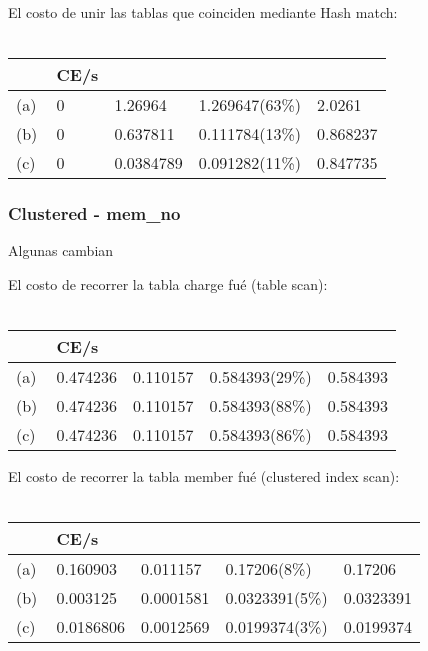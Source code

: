 El costo de unir las tablas que coinciden mediante Hash match: \\ \\

\begin{tabular}{| L | L | L | L | L |}
    \hline
     & CE/s &  &  &  \\ \hline
    (a) & 0 & 1.26964 & 1.269647(63\%) & 2.0261 \\ \hline
    (b) & 0 & 0.637811 & 0.111784(13\%) & 0.868237 \\ \hline
    (c) & 0 & 0.0384789 & 0.091282(11\%) & 0.847735 \\ \hline
\end{tabular}




\subsubsection{Clustered - mem\_no}

Algunas cambian

El costo de recorrer la tabla charge fué (table scan): \\ \\

\begin{tabular}{| L | L | L | L | L |}
    \hline
     & CE/s &  &  &  \\ \hline
    (a) & 0.474236 & 0.110157 & 0.584393(29\%) & 0.584393 \\ \hline
    (b) & 0.474236 & 0.110157 & 0.584393(88\%) & 0.584393 \\ \hline
    (c) & 0.474236 & 0.110157 & 0.584393(86\%) & 0.584393 \\ \hline
\end{tabular}

El costo de recorrer la tabla member fué (clustered index scan): \\ \\

\begin{tabular}{| L | L | L | L | L |}
    \hline
     & CE/s &  &  &  \\ \hline
    (a) & 0.160903 & 0.011157 & 0.17206(8\%) & 0.17206 \\ \hline
    (b) & 0.003125 & 0.0001581 & 0.0323391(5\%) & 0.0323391 \\ \hline
    (c) & 0.0186806 & 0.0012569 & 0.0199374(3\%) & 0.0199374 \\ \hline
\end{tabular}

